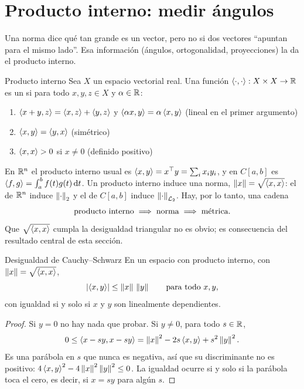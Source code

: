 \section{Producto interno: medir ángulos}
\label{sec:pm-producto}

Una norma dice qué tan grande es un vector, pero no si dos vectores ``apuntan para el mismo lado''. Esa información (ángulos, ortogonalidad, proyecciones) la da el producto interno.

\begin{definicion}[label=def:pm-pinterno]{Producto interno}
Sea $X$ un espacio vectorial real. Una función $\left\langle \cdot,\cdot\right\rangle:X\times X\to\mathbb{R}$ es un  si para todo $x,y,z\in X$ y $\alpha\in\mathbb{R}$:
\begin{enumerate}[label=(P\arabic*),leftmargin=3em]
  \item $\left\langle x+y,z\right\rangle=\left\langle x,z\right\rangle+\left\langle y,z\right\rangle$ y $\left\langle \alpha x,y\right\rangle=\alpha\left\langle x,y\right\rangle$ \hfill(lineal en el primer argumento)
  \item $\left\langle x,y\right\rangle=\left\langle y,x\right\rangle$ \hfill(simétrico)
  \item $\left\langle x,x\right\rangle>0$ si $x\neq0$ \hfill(definido positivo)
\end{enumerate}
\end{definicion}

En $\mathbb{R}^n$ el producto interno usual es $\left\langle x,y\right\rangle=x^{\top} y=\sum_ix_iy_i$, y en $C[a,b]$ es $\left\langle f,g\right\rangle=\int_a^bf(t)g(t)\,\mathrm{d} t$. Un producto interno induce una norma, $\left\lVert x\right\rVert=\sqrt{\left\langle x,x\right\rangle}$: el de $\mathbb{R}^n$ induce $\left\lVert \cdot\right\rVert_2$ y el de $C[a,b]$ induce $\left\lVert \cdot\right\rVert_{\mathcal{L}_{2}}$. Hay, por lo tanto, una cadena
\[
  \text{producto interno}\;\Longrightarrow\;\text{norma}\;\Longrightarrow\;\text{métrica}.
\]
Que $\sqrt{\left\langle x,x\right\rangle}$ cumpla la desigualdad triangular no es obvio; es consecuencia del resultado central de esta sección.

\begin{teorema}[label=thm:pm-cs]{Desigualdad de Cauchy--Schwarz}
En un espacio con producto interno, con $\left\lVert x\right\rVert=\sqrt{\left\langle x,x\right\rangle}$,
\[
  \left\lvert \left\langle x,y\right\rangle\right\rvert\le\left\lVert x\right\rVert\,\left\lVert y\right\rVert\qquad\text{para todo }x,y,
\]
con igualdad si y solo si $x$ y $y$ son linealmente dependientes.
\end{teorema}

\begin{proof}
Si $y=0$ no hay nada que probar. Si $y\neq0$, para todo $s\in\mathbb{R}$,
\[
  0\le\left\langle x-sy,x-sy\right\rangle=\left\lVert x\right\rVert^2-2s\left\langle x,y\right\rangle+s^2\left\lVert y\right\rVert^2 .
\]
Es una parábola en $s$ que nunca es negativa, así que su discriminante no es positivo: $4\left\langle x,y\right\rangle^2-4\left\lVert x\right\rVert^2\left\lVert y\right\rVert^2\le0$. La igualdad ocurre si y solo si la parábola toca el cero, es decir, si $x=sy$ para algún $s$.
\end{proof}

